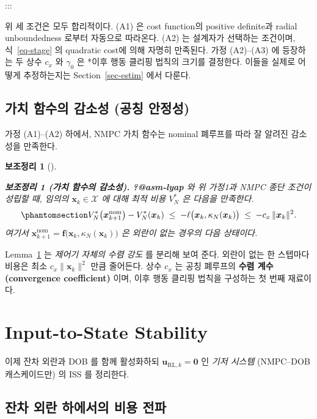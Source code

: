 \documentclass[
  11pt,
]{article}
\theoremstyle{plain}
\newtheorem{lemma}{보조정리}[section]
\theoremstyle{plain}
\theoremstyle{definition}
\theoremstyle{remark}
\begin{document}
:::

위 세 조건은 모두 합리적이다. (A1) 은 cost function의 positive
definite과 radial unboundedness 로부터 자동으로 따라온다. (A2) 는
설계자가 선택하는 조건이며, 식~\ref{eq-stage} 의 quadratic cost에 의해
자명히 만족된다. 가정 (A2)--(A3) 에 등장하는 두 상수 \(c_x\) 와
\(\gamma_0\) 은 *이후 행동 클리핑 법칙의 크기를 결정한다. 이들을 실제로
어떻게 추정하는지는 Section~\ref{sec-estim} 에서 다룬다.

\subsection{가치 함수의 감소성 (공칭 안정성)}\label{sec-vfdescent}

가정 (A1)--(A2) 하에서, NMPC 가치 함수는 nominal 폐루프를 따라 잘 알려진
감소성을 만족한다.

\begin{lemma}[]\protect\hypertarget{lem-descent}{}\label{lem-descent}

\textbf{보조정리 1 (가치 함수의 감소성).} \textbf{?@asm-lyap} 와 위
가정1과 NMPC 종단 조건이 성립할 때, 임의의 \(\bm{x}_k \in \mathcal{X}\)
에 대해 최적 비용 \(V_N^*\) 은 다음을 만족한다.
\begin{equation}\protect\phantomsection\label{eq-descent}{
V_N^*\bigl(\bm{x}_{k+1}^{\mathrm{nom}}\bigr) - V_N^*(\bm{x}_k)
\;\le\;
-\ell\bigl(\bm{x}_k,\kappa_N(\bm{x}_k)\bigr)
\;\le\;
-c_x\,\|\bm{x}_k\|^2.
}\end{equation} 여기서
\(\bm{x}_{k+1}^{\mathrm{nom}} = \bm{f}\bigl(\bm{x}_k,\kappa_N(\bm{x}_k)\bigr)\)
은 외란이 없는 경우의 다음 상태이다.

\end{lemma}

Lemma~\ref{lem-descent} 는 \emph{제어기 자체의 수렴 강도} 를 분리해 보여
준다. 외란이 없는 한 스텝마다 비용은 최소 \(c_x\|\bm{x}_k\|^2\) 만큼
줄어든다. 상수 \(c_x\) 는 공칭 폐루프의 \textbf{수렴 계수 (convergence
coefficient)} 이며, 이후 행동 클리핑 법칙을 구성하는 첫 번째 재료이다.

\section{Input-to-State Stability}\label{sec-iss}

이제 잔차 외란과 DOB 를 함께 활성화하되
\(\bm{u}_{\mathrm{RL},k} = \bm{0}\) 인 \emph{기저 시스템} (NMPC--DOB
캐스케이드만) 의 ISS 를 정리한다.

\subsection{잔차 외란 하에서의 비용
전파}\label{uxc794uxcc28-uxc678uxb780-uxd558uxc5d0uxc11cuxc758-uxbe44uxc6a9-uxc804uxd30c}
\end{document}
